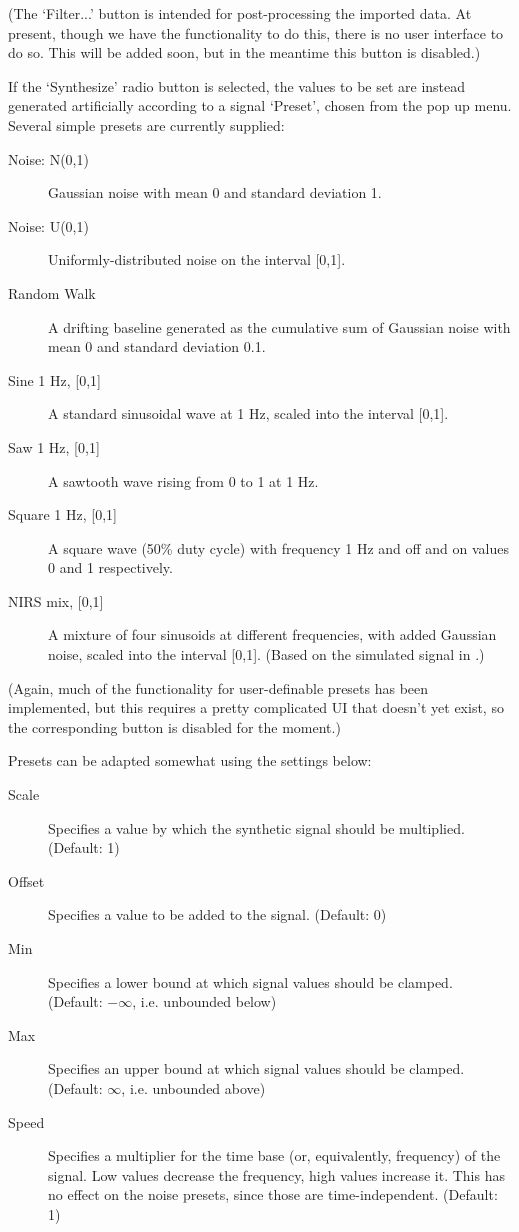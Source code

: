 \documentclass[a4paper,11pt]{article}
\begin{document}
(The `Filter...' button is intended for post-processing the imported data. At present, though we have the functionality to do this, there is no user interface to do so. This will be added soon, but in the meantime this button is disabled.)

If the `Synthesize' radio button is selected, the values to be set are instead generated artificially according to a signal `Preset', chosen from the pop up menu. Several simple presets are currently supplied:

\begin{adjustwidth}{0.8cm}{0.8cm}
\begin{description}
\item[Noise: N(0,1)] Gaussian noise with mean 0 and standard deviation 1.
\item[Noise: U(0,1)] Uniformly-distributed noise on the interval [0,1].
\item[Random Walk] A drifting baseline generated as the cumulative sum of Gaussian noise with mean 0 and standard deviation 0.1.
\item[Sine 1 Hz, {[0,1]}] A standard sinusoidal wave at 1 Hz, scaled into the interval [0,1].
\item[Saw 1 Hz, {[0,1]}] A sawtooth wave rising from 0 to 1 at 1 Hz.
\item[Square 1 Hz, {[0,1]}] A square wave (50\% duty cycle) with frequency 1 Hz and off and on values 0 and 1 respectively.
\item[NIRS mix, {[0,1]}] A mixture of four sinusoids at different frequencies, with added Gaussian noise, scaled into the interval [0,1]. (Based on the simulated signal in \citet{Scholkmann:2010iy}.)
\end{description}
\end{adjustwidth}

(Again, much of the functionality for user-definable presets has been implemented, but this requires a pretty complicated UI that doesn't yet exist, so the corresponding button is disabled for the moment.)

Presets can be adapted somewhat using the settings below:

\begin{adjustwidth}{0.8cm}{0.8cm}
\begin{description}
\item[Scale] Specifies a value by which the synthetic signal should be multiplied. (Default: 1)
\item[Offset] Specifies a value to be added to the signal. (Default: 0)
\item[Min] Specifies a lower bound at which signal values should be clamped. (Default: $-\infty$, i.e. unbounded below)
\item[Max] Specifies an upper bound at which signal values should be clamped. (Default: $\infty$, i.e. unbounded above)
\item[Speed] Specifies a multiplier for the time base (or, equivalently, frequency) of the signal. Low values decrease the frequency, high values increase it. This has no effect on the noise presets, since those are time-independent. (Default: 1)
\end{description}
\end{adjustwidth}
\end{document}
